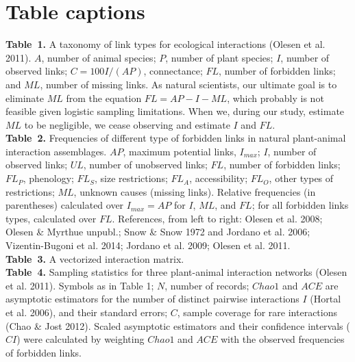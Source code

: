 \documentclass[12pt]{article}
\begin{document}
\section*{Table captions}
\noindent \textbf{Table~1.} A taxonomy of link types for ecological interactions (Olesen et al. 2011). $A$, number of animal species; $P$, number of plant species; $I$, number of observed links; $C= 100 I/(AP)$, connectance; $FL$, number of forbidden links; and $ML$, number of missing links. As natural scientists, our ultimate goal is to eliminate $ML$ from the equation $FL = AP - I - ML$, which probably is not feasible given logistic sampling limitations. When we, during our study, estimate $ML$ to be negligible, we cease observing and estimate $I$ and $FL$.\\

\noindent \textbf{Table~2.} Frequencies of different type of forbidden links in natural plant-animal interaction assemblages. $AP$, maximum potential links, $I_{max}$; $I$, number of observed links; $UL$, number of unobserved links; $FL$, number of forbidden links; $FL_P$, phenology; $FL_S$, size restrictions; $FL_A$, accessibility; $FL_O$, other types of restrictions; $ML$, unknown causes (missing links). Relative frequencies (in parentheses) calculated over $I_{max}= AP$ for $I$, $ML$, and $FL$; for all forbidden links types, calculated over $FL$. References, from left to right: Olesen et al. 2008; Olesen \& Myrthue unpubl.; Snow \& Snow 1972 and Jordano et al. 2006; Vizentin-Bugoni et al. 2014; Jordano et al. 2009; Olesen et al. 2011.  \\

\noindent \textbf{Table~3.} A vectorized interaction matrix.\\

\noindent \textbf{Table~4.} Sampling statistics for three plant-animal interaction networks (Olesen et al. 2011). Symbols as in Table 1; $N$, number of records; $Chao1$ and $ACE$ are asymptotic estimators for the number of distinct pairwise interactions $I$ (Hortal et al. 2006), and their standard errors; $C$, sample coverage for rare interactions (Chao \& Jost 2012). Scaled asymptotic estimators and their confidence intervals ($CI$) were calculated by weighting $Chao1$ and $ACE$ with the observed frequencies of forbidden links. \\
%
\newpage
\end{document}
